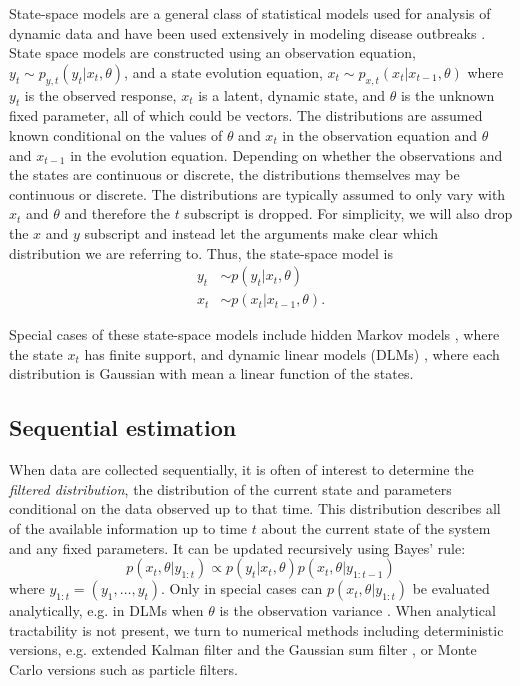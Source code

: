 \documentclass{elsarticle}
\begin{document}
State-space models are a general class of statistical models used for analysis of dynamic data and have been used extensively in modeling disease outbreaks \citep{Mart:Cone:Lope:Lope:baye:2008,watkins2009disease,merl2009statistical,ludkovski2010optimal,skvortsov2012monitoring}.  State space models are constructed using an observation equation, $y_t \sim p_{y,t}(y_t|x_t,\theta)$, and a state evolution equation, $x_t \sim p_{x,t}(x_t|x_{t-1},\theta)$ where $y_t$ is the observed response, $x_t$ is a latent, dynamic state, and $\theta$ is the unknown fixed parameter, all of which could be vectors. The distributions are assumed known conditional on the values of $\theta$ and $x_t$ in the observation equation and $\theta$ and $x_{t-1}$ in the evolution equation. Depending on whether the observations and the states are continuous or discrete, the distributions themselves may be continuous or discrete. The distributions are typically assumed to only vary with $x_t$ and $\theta$ and therefore the $t$ subscript is dropped.
For simplicity, we will also drop the $x$ and $y$ subscript and instead let the arguments make clear which distribution we are referring to. Thus, the state-space model is
\begin{align*}
y_t &\sim p(y_t|x_t,\theta) \\
x_t &\sim p(x_t|x_{t-1},\theta).
\end{align*}

Special cases of these state-space models include hidden Markov models \citep{cappe2005inference}, where the state $x_t$ has finite support, and dynamic linear models (DLMs) \citep{West:Harr:baye:1997}, where each distribution is Gaussian with mean a linear function of the states.

\subsection{Sequential estimation \label {sec:sequential}}

When data are collected sequentially, it is often of interest to determine the \emph{filtered distribution}, the distribution of the current state and parameters conditional on the data observed up to that time. This distribution describes all of the available information up to time $t$ about the current state of the system and any fixed parameters. It can be updated recursively using Bayes' rule:
\begin{equation}
p(x_t,\theta| y_{1:t}) \propto p(y_t|x_t,\theta)p(x_t,\theta|y_{1:t-1}) \label{eqn:filtered}
\end{equation}
where $y_{1:t} = (y_1,\ldots,y_t)$. Only in special cases can $p(x_t,\theta| y_{1:t})$ be evaluated analytically, e.g. in DLMs when $\theta$ is the observation variance \cite[Sec 4.3,][]{petris2009dynamic}. When analytical tractability is not present, we turn to numerical methods including deterministic versions, e.g. extended Kalman filter and the Gaussian sum filter \citep{Alsp:Sore:nonl:1972}, or Monte Carlo versions such as particle filters.
\end{document}
